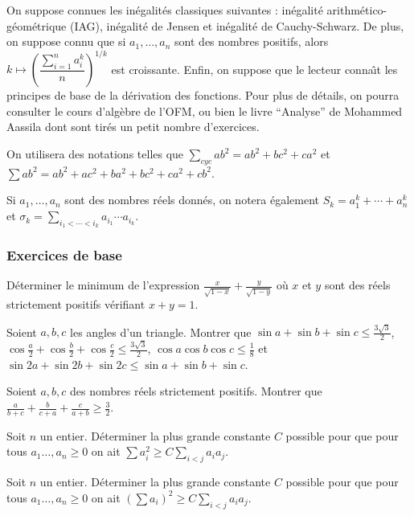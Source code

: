
On suppose connues les in\'egalit\'es classiques suivantes : in\'egalit\'e arithm\'etico-g\'eom\'etrique (IAG), in\'egalit\'e de Jensen
et in\'egalit\'e de Cauchy-Schwarz.
De plus, on suppose connu que si $a_1,\ldots,a_n$ sont des nombres positifs, alors $k\mapsto \left(\dfrac{\sum_{i=1}^n a_i^k}{n}\right)^{1/k}$ est croissante.
Enfin, on suppose que le lecteur conna\^{\i}t les principes de base de la d\'erivation des fonctions.
Pour plus de d\'etails, on pourra consulter le cours d'alg\`ebre de l'OFM, ou bien le livre
``Analyse'' de Mohammed Aassila dont sont tir\'es un petit nombre d'exercices.

On utilisera des notations telles que $\sum_{cyc}ab^2=ab^2+bc^2+ca^2$ et $\sum ab^2=ab^2+ac^2+ba^2+bc^2+ca^2+cb^2$.

Si $a_1,\ldots,a_n$ sont des nombres r\'eels donn\'es, on notera \'egalement $S_k=a_1^k+\cdots+a_n^k$ et $\sigma_k=\sum_{i_1<\cdots<i_k}a_{i_1}\cdots a_{i_k}$.

\subsubsection{Exercices de base}

\begin{exo}
 D\'eterminer le minimum de l'expression $\frac{x}{\sqrt{1-x}}+\frac{y}{\sqrt{1-y}}$ o\`u $x$ et $y$ sont des r\'eels strictement positifs v\'erifiant $x+y=1$.
\end{exo}

\begin{exo}
 Soient $a,b,c$ les angles d'un triangle. Montrer que $\sin a+\sin b+\sin c\leqslant \frac{3\sqrt{3}}{2}$, $\cos\frac{a}{2}+\cos\frac{b}{2}+\cos\frac{c}{2}\leqslant \frac{3\sqrt{3}}{2}$, $\cos a\cos b\cos c\leqslant \frac{1}{8}$ et $\sin 2a+\sin 2b+\sin 2c\leqslant \sin a +\sin b+\sin c$.
\end{exo}

\begin{exo}
 Soient $a,b,c$ des nombres r\'eels strictement positifs. Montrer que $\frac{a}{b+c}+\frac{b}{c+a}+\frac{c}{a+b}\geqslant \frac{3}{2}$.
\end{exo}

\begin{exo}
Soit $n$ un entier. D\'eterminer la plus grande constante $C$ possible pour que pour tous $a_1\ldots,a_n\geqslant 0$ on ait $\sum a_i^2\geqslant C\sum_{i<j}a_ia_j$. 
\end{exo}


\begin{exo}
Soit $n$ un entier. D\'eterminer la plus grande constante $C$ possible pour que pour tous $a_1\ldots,a_n\geqslant 0$ on ait $(\sum a_i)^2\geqslant C\sum_{i<j}a_ia_j$. 
\end{exo}

